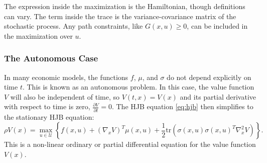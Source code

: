\documentclass[../../lecture_notes.tex]{subfiles}
\begin{document}
The expression inside the maximization is the Hamiltonian, though definitions can vary.
The term inside the trace is the variance-covariance matrix of the stochastic process.
Any path constraints, like $G(x,u) \ge 0$, can be included in the maximization over $u$.

\subsubsection{The Autonomous Case}
In many economic models, the functions $f$, $\mu$, and $\sigma$ do not depend explicitly on time $t$.
This is known as an autonomous problem.
In this case, the value function $V$ will also be independent of time, so $V(t,x) = V(x)$ and its partial derivative with respect to time is zero, $\frac{\partial V}{\partial t} = 0$.
The HJB equation \eqref{eq:hjb} then simplifies to the stationary HJB equation:
\begin{equation*}
  \rho V(x) = \max_{u \in \mathcal{U}} \left\{ f(x,u) + (\nabla_x V)^T \mu(x,u) + \frac{1}{2} \text{tr}\left( \sigma(x,u) \sigma(x,u)^T \nabla_x^2 V \right) \right\}.
\end{equation*}
This is a non-linear ordinary or partial differential equation for the value function $V(x)$.
\end{document}
